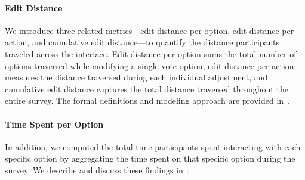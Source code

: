 \paragraph{Edit Distance} We introduce three related metrics---edit distance per option, edit distance per action, and cumulative edit distance---to quantify the distance participants traveled across the interface. Edit distance per option sums the total number of options traversed while modifying a single vote option, edit distance per action measures the distance traversed during each individual adjustment, and cumulative edit distance captures the total distance traversed throughout the entire survey. The formal definitions and modeling approach are provided in~.

\paragraph{Time Spent per Option} In addition, we computed the total time participants spent interacting with each specific option by aggregating the time spent on that specific option during the survey. We describe and discuss these findings in~.